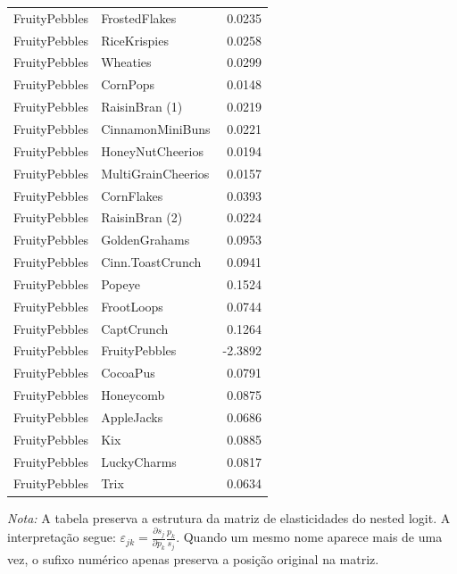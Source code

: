 \begin{table}[H]
\begin{tabular}{llr}
FruityPebbles & FrostedFlakes & 0.0235 \\
FruityPebbles & RiceKrispies & 0.0258 \\
FruityPebbles & Wheaties & 0.0299 \\
FruityPebbles & CornPops & 0.0148 \\
FruityPebbles & RaisinBran (1) & 0.0219 \\
FruityPebbles & CinnamonMiniBuns & 0.0221 \\
FruityPebbles & HoneyNutCheerios & 0.0194 \\
FruityPebbles & MultiGrainCheerios & 0.0157 \\
FruityPebbles & CornFlakes & 0.0393 \\
FruityPebbles & RaisinBran (2) & 0.0224 \\
FruityPebbles & GoldenGrahams & 0.0953 \\
FruityPebbles & Cinn.ToastCrunch & 0.0941 \\
FruityPebbles & Popeye & 0.1524 \\
FruityPebbles & FrootLoops & 0.0744 \\
FruityPebbles & CaptCrunch & 0.1264 \\
FruityPebbles & FruityPebbles & -2.3892 \\
FruityPebbles & CocoaPus & 0.0791 \\
FruityPebbles & Honeycomb & 0.0875 \\
FruityPebbles & AppleJacks & 0.0686 \\
FruityPebbles & Kix & 0.0885 \\
FruityPebbles & LuckyCharms & 0.0817 \\
FruityPebbles & Trix & 0.0634 \\
\bottomrule
\end{tabular}

\vspace{0.3em}
\footnotesize
\textit{Nota:} A tabela preserva a estrutura da matriz de elasticidades do nested logit. A interpretação segue: $\varepsilon_{jk}=\frac{\partial s_j}{\partial p_k}\frac{p_k}{s_j}$. Quando um mesmo nome aparece mais de uma vez, o sufixo numérico apenas preserva a posição original na matriz.
\end{table}
\endgroup


